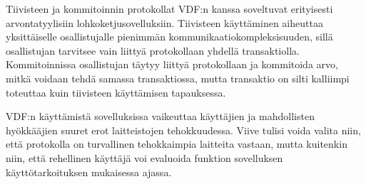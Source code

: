Tiivisteen ja kommitoinnin protokollat VDF:n kanssa soveltuvat erityisesti arvontatyylisiin lohkoketjusovelluksiin. Tiivisteen käyttäminen aiheuttaa yksittäiselle osallistujalle pienimmän kommunikaatiokompleksisuuden, sillä osallistujan tarvitsee vain liittyä protokollaan yhdellä transaktiolla. Kommitoinnissa osallistujan täytyy liittyä protokollaan ja kommitoida arvo, mitkä voidaan tehdä samassa transaktiossa, mutta transaktio on silti kalliimpi toteuttaa kuin tiivisteen käyttämisen tapauksessa.

VDF:n käyttämistä sovelluksissa vaikeuttaa käyttäjien ja mahdollisten hyökkääjien suuret erot laitteistojen tehokkuudessa. Viive tulisi voida valita niin, että protokolla on turvallinen tehokkaimpia laitteita vastaan, mutta kuitenkin niin, että rehellinen käyttäjä voi evaluoida funktion sovelluksen käyttötarkoituksen mukaisessa ajassa.